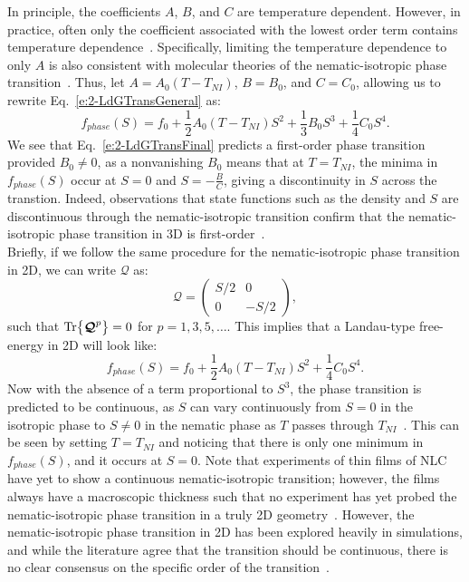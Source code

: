 In principle, the coefficients $A$, $B$, and $C$ are temperature dependent.
However, in practice, often only the coefficient associated with the lowest order term contains temperature dependence~\cite{RN33,RN175}.
Specifically, limiting the temperature dependence to only $A$ is also consistent with molecular theories of the nematic-isotropic phase transition~\cite{RN33}.
Thus, let $A = A_0(T-T_{NI})$, $B = B_0$, and $C = C_0$, allowing us to rewrite Eq.~\ref{e:2-LdGTransGeneral} as:
\begin{equation}
  f_{phase}(S) = f_0 + \frac{1}{2}A_0(T-T_{NI}) S^2 + \frac{1}{3}B_0 S^3 + \frac{1}{4}C_0 S^4.\label{e:2-LdGTransFinal}
\end{equation}
We see that Eq.~\ref{e:2-LdGTransFinal} predicts a first-order phase transition provided $B_0 \neq  0$, as a nonvanishing $B_0$ means that at $T = T_{NI}$, the minima in $f_{phase}(S)$ occur at $S = 0$ and $S = -\frac{B}{C}$, giving a discontinuity in $S$ across the transtion.
Indeed, observations that state functions such as the density and $S$ are discontinuous through the nematic-isotropic transition confirm that the nematic-isotropic phase transition in 3D is first-order~\cite{RN33}. \\

Briefly, if we follow the same procedure for the nematic-isotropic phase transition in 2D, we can write $\bm{\mathcal{Q}}$ as:
\begin{equation}
  \bm{\mathcal{Q}} =
  \begin{pmatrix}
    S/2 & 0 \\
    0 & -S/2
  \end{pmatrix},
\end{equation}
such that $\textup{Tr} \big \{ \bm{\mathcal{Q}}^p \big \} = 0$ for $p = 1,3,5,\dots$.
This implies that a Landau-type free-energy in 2D will look like:
\begin{equation}
  f_{phase}(S) = f_0 + \frac{1}{2}A_0(T-T_{NI}) S^2 + \frac{1}{4}C_0 S^4.
\end{equation}
Now with the absence of a term proportional to $S^3$, the phase transition is predicted to be continuous, as $S$ can vary continuously from $S=0$ in the isotropic phase to $S \neq 0$ in the nematic phase as $T$ passes through $T_{NI}$~\cite{RN33}.
This can be seen by setting $T = T_{NI}$ and noticing that there is only one minimum in $f_{phase}(S)$, and it occurs at $S=0$.
Note that experiments of thin films of NLC have yet to show a continuous nematic-isotropic transition; however, the films always have a macroscopic thickness such that no experiment has yet probed the nematic-isotropic phase transition in a truly 2D geometry~\cite{RN231}.
However, the nematic-isotropic phase transition in 2D has been explored heavily in simulations, and while the literature agree that the transition should be continuous, there is no clear consensus on the specific order of the transition~\cite{RN172}.


